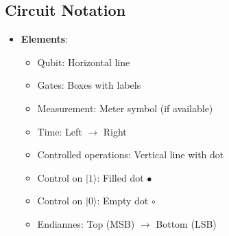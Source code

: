 \begin{multicols}{3}
                  \section*{Circuit Notation}
                  \begin{itemize}[leftmargin=*,nosep,topsep=0pt]
                    \item \textbf{Elements}:
                      \begin{itemize}[nosep]
                        \item Qubit: Horizontal line
                        \item Gates: Boxes with labels
                        \item Measurement: Meter symbol (if available)
                        \item Time: Left $\to$ Right
                        \item Controlled operations: Vertical line with dot
                        \item Control on $|1\rangle$: Filled dot $\bullet$
                        \item Control on $|0\rangle$: Empty dot $\circ$
                        \item Endiannes: Top (MSB) $\to$ Bottom (LSB)
                      \end{itemize}
                  \end{itemize}


\end{multicols}
